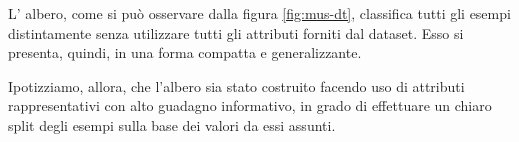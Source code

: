					
			L' albero, come si può osservare dalla figura \vref{fig:mus-dt}, classifica tutti gli esempi distintamente senza utilizzare tutti gli attributi forniti dal dataset. Esso si presenta, quindi, in una forma compatta e generalizzante.\par
			Ipotizziamo, allora, che l'albero sia stato costruito facendo uso di attributi rappresentativi con alto guadagno informativo, in grado di effettuare un chiaro split degli esempi sulla base dei valori da essi assunti.
			
			
